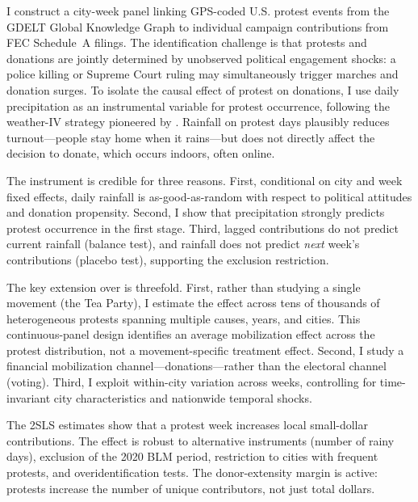 \documentclass[12pt]{article}
\begin{document}
I construct a city-week panel linking GPS-coded U.S. protest events from the GDELT Global Knowledge Graph \citep{gdelt2013} to individual campaign contributions from FEC Schedule~A filings. The identification challenge is that protests and donations are jointly determined by unobserved political engagement shocks: a police killing or Supreme Court ruling may simultaneously trigger marches and donation surges. To isolate the causal effect of protest on donations, I use daily precipitation as an instrumental variable for protest occurrence, following the weather-IV strategy pioneered by \citet{madestam2013}. Rainfall on protest days plausibly reduces turnout---people stay home when it rains---but does not directly affect the decision to donate, which occurs indoors, often online.

The instrument is credible for three reasons. First, conditional on city and week fixed effects, daily rainfall is as-good-as-random with respect to political attitudes and donation propensity. Second, I show that precipitation strongly predicts protest occurrence in the first stage. Third, lagged contributions do not predict current rainfall (balance test), and rainfall does not predict \textit{next} week's contributions (placebo test), supporting the exclusion restriction.

The key extension over \citet{madestam2013} is threefold. First, rather than studying a single movement (the Tea Party), I estimate the effect across tens of thousands of heterogeneous protests spanning multiple causes, years, and cities. This continuous-panel design identifies an average mobilization effect across the protest distribution, not a movement-specific treatment effect. Second, I study a financial mobilization channel---donations---rather than the electoral channel (voting). Third, I exploit within-city variation across weeks, controlling for time-invariant city characteristics and nationwide temporal shocks.

The 2SLS estimates show that a protest week increases local small-dollar contributions. The effect is robust to alternative instruments (number of rainy days), exclusion of the 2020 BLM period, restriction to cities with frequent protests, and overidentification tests. The donor-extensity margin is active: protests increase the number of unique contributors, not just total dollars.
\end{document}
